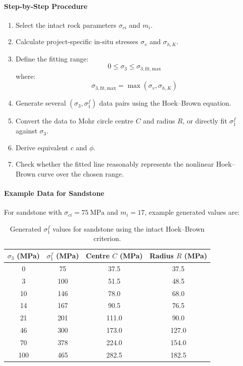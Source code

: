 \paragraph{Step-by-Step Procedure}

\begin{enumerate}
 \item Select the intact rock parameters \(\sigma_{ci}\) and \(m_i\).
 \item Calculate project-specific in-situ stresses \(\sigma_v\) and \(\sigma_{h,K}\).
 \item Define the fitting range:
 \[
 0 \leq \sigma_3 \leq \sigma_{3,\mathrm{fit,max}}
 \]
 where:
 \[
 \sigma_{3,\mathrm{fit,max}}=\max(\sigma_v,\sigma_{h,K})
 \]
 \item Generate several \((\sigma_3,\sigma_1^f)\) data pairs using the Hoek--Brown equation.
 \item Convert the data to Mohr circle centre \(C\) and radius \(R\), or directly fit
 \(\sigma_1^f\) against \(\sigma_3\).
 \item Derive equivalent \(c\) and \(\phi\).
 \item Check whether the fitted line reasonably represents the nonlinear Hoek--Brown curve
 over the chosen range.
\end{enumerate}

\paragraph{Example Data for Sandstone}

For sandstone with \(\sigma_{ci}=75~\text{MPa}\) and \(m_i=17\), example generated values are:

\begin{table}[H]
\centering
\small
\begin{tabular}{c c c c}
\toprule
\(\sigma_3\) (MPa) & \(\sigma_1^f\) (MPa) & Centre \(C\) (MPa) & Radius \(R\) (MPa) \\
\midrule
0 & 75 & 37.5 & 37.5 \\
3 & 100 & 51.5 & 48.5 \\
10 & 146 & 78.0 & 68.0 \\
14 & 167 & 90.5 & 76.5 \\
21 & 201 & 111.0 & 90.0 \\
46 & 300 & 173.0 & 127.0 \\
70 & 378 & 224.0 & 154.0 \\
100 & 465 & 282.5 & 182.5 \\
\bottomrule
\end{tabular}
\caption{Generated \(\sigma_1^f\) values for sandstone using the intact Hoek--Brown criterion.}
\end{table}

